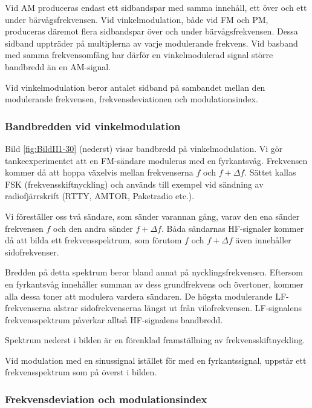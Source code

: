 Vid AM produceras endast ett sidbandspar med samma innehåll, ett över och ett
under bärvågsfrekvensen.
Vid vinkelmodulation, både vid FM och PM, produceras däremot flera sidbandspar
över och under bärvågsfrekvensen.
Dessa sidband uppträder på multiplerna av varje modulerande frekvens.
Vid basband med samma frekvensomfång har därför en vinkelmodulerad signal
större bandbredd än en AM-signal.

Vid vinkelmodulation beror antalet sidband på sambandet mellan den modulerande
frekvensen, frekvensdeviationen och modulationsindex.


\subsubsection{Bandbredden vid vinkelmodulation}

Bild \ref{fig:BildII1-30} (nederst) visar bandbredd på vinkelmodulation.
Vi gör tankeexperimentet att en FM-sändare moduleras med en fyrkantsvåg.
Frekvensen kommer då att hoppa växelvis mellan frekvenserna \(f\) och
\(f + \Delta f\).
Sättet kallas FSK (frekvensskiftnyckling) och används till exempel vid sändning av
radiofjärrskrift (RTTY, AMTOR, Paketradio etc.).

Vi föreställer oss två sändare, som sänder varannan gång, varav den ena sänder
frekvensen \(f\) och den andra sänder \(f + \Delta f\).
Båda sändarnas HF-signaler kommer då att bilda ett frekvensspektrum, som
förutom \(f\) och \(f + \Delta f\) även innehåller sidofrekvenser.

Bredden på detta spektrum beror bland annat på nycklingsfrekvensen.
Eftersom en fyrkantsvåg innehåller summan av dess grundfrekvens och övertoner,
kommer alla dessa toner att modulera vardera sändaren.
De högsta modulerande LF-frekvenserna alstrar sidofrekvenserna längst ut från
vilofrekvensen.
LF-signalens frekvensspektrum påverkar alltså HF-signalens bandbredd.

Spektrum nederst i bilden är en förenklad framställning av
frekvensskiftnyckling.

Vid modulation med en sinussignal istället för med en fyrkantssignal, uppstår
ett frekvensspektrum som på överst i bilden.

\subsubsection{Frekvensdeviation och modulationsindex}

